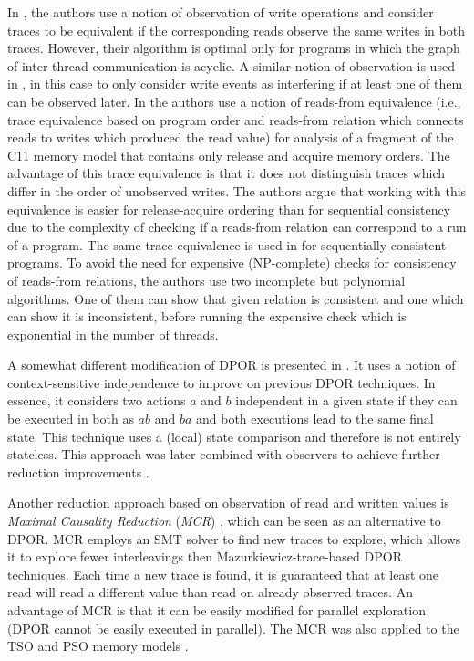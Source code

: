 In , the authors use a notion of observation of write operations and consider traces to be equivalent if the corresponding reads observe the same writes in both traces.
However, their algorithm is optimal only for programs in which the graph of inter-thread communication is acyclic.
A similar notion of observation is used in , in this case to only consider write events as interfering if at least one of them can be observed later.
In  the authors use a notion of reads-from equivalence (i.e., trace equivalence based on program order and reads-from relation which connects reads to writes which produced the read value) for analysis of a fragment of the C11 memory model that contains only release and acquire memory orders.
The advantage of this trace equivalence is that it does not distinguish traces which differ in the order of unobserved writes.
The authors argue that working with this equivalence is easier for release-acquire ordering than for sequential consistency due to the complexity of checking if a reads-from relation can correspond to a run of a program.
The same trace equivalence is used in  for sequentially-consistent programs.
To avoid the need for expensive (NP-complete) checks for consistency of reads-from relations, the authors use two incomplete but polynomial algorithms.
One of them can show that given relation is consistent and one which can show it is inconsistent, before running the expensive check which is exponential in the number of threads.

A somewhat different modification of DPOR is presented in .
It uses a notion of context-sensitive independence to improve on previous DPOR techniques.
In essence, it considers two actions $a$ and $b$ independent in a given state if they can be executed in both as $ab$ and $ba$ and both executions lead to the same final state.
This technique uses a (local) state comparison and therefore is not entirely stateless.
This approach was later combined with observers to achieve further reduction improvements .

Another reduction approach based on observation of read and written values is
\emph{Maximal Causality Reduction} (\emph{MCR}) , which can be
seen as an alternative to DPOR.
MCR employs an SMT solver to find new traces to explore, which allows it to
explore fewer interleavings then Mazurkiewicz-trace-based DPOR techniques.
Each time a new trace is found, it is guaranteed that at least one read will read a different value than read on already observed traces.
An advantage of MCR is that it can be easily modified for parallel
exploration (DPOR cannot be easily executed in parallel).
The MCR was also applied to the TSO and PSO memory models .

